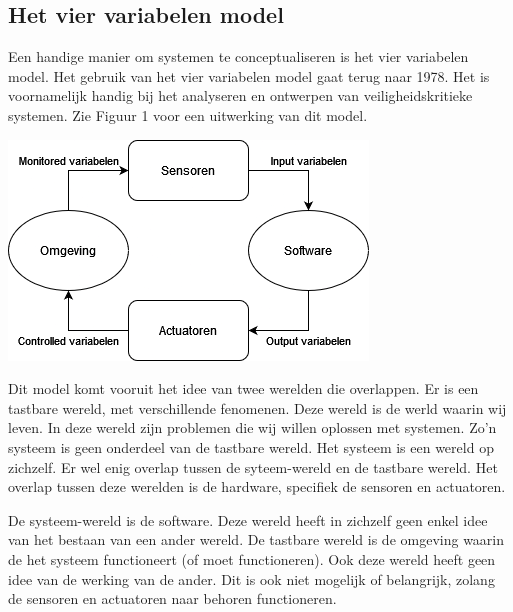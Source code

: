 \documentclass{article}
\begin{document}
		\subsection{Het vier variabelen model}
		
		Een handige manier om systemen te conceptualiseren is het vier variabelen model. Het gebruik van het vier variabelen model gaat terug naar 1978. Het is voornamelijk handig bij het analyseren en ontwerpen van veiligheidskritieke systemen. \cite{patcas2014system} Zie Figuur 1 voor een uitwerking van dit model. \par
		
		\begin{center}
			\begin{minipage}{0.48\linewidth}
				\includegraphics[width=\linewidth]{4variabelen.png}
			\end{minipage}
			\hfill
		\end{center}

		Dit model komt vooruit het idee van twee werelden die overlappen. Er is een tastbare wereld, met verschillende fenomenen. Deze wereld is de werld waarin wij leven. In deze wereld zijn problemen die wij willen oplossen met systemen. Zo'n systeem is geen onderdeel van de tastbare wereld. Het systeem is een wereld op zichzelf. Er wel enig overlap tussen de syteem-wereld en de tastbare wereld. Het overlap tussen deze werelden is de hardware, specifiek de sensoren en actuatoren. \par

		De systeem-wereld is de software. Deze wereld heeft in zichzelf geen enkel idee van het bestaan van een ander wereld. De tastbare wereld is de omgeving waarin de het systeem functioneert (of moet functioneren). Ook deze wereld heeft geen idee van de werking van de ander. Dit is ook niet mogelijk of belangrijk, zolang de sensoren en actuatoren naar behoren functioneren. \par
\end{document}
